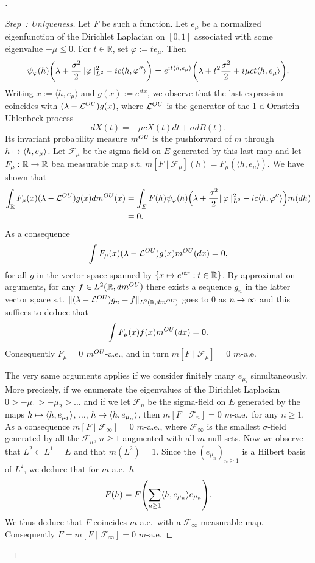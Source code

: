 \documentclass[10pt]{amsart}
\theoremstyle{definition}\newtheorem{defi}[theo]{Definition}\newtheorem{rema}[theo]{Remark}\newtheorem{exam}[theo]{Example}\newtheorem{exem}[theo]{Example}\newtheorem{nota}[theo]{Notation}
\theoremstyle{plain}
\newcommand{\cF}{\mathcal{F}}
\newcommand{\cL}{\mathcal{L}}
\newcommand{\R}{\mathbb{R}}
\let\originalleft\left
\let\originalright\right
\renewcommand{\left}{\mathopen{}\mathclose\bgroup\originalleft}
\renewcommand{\right}{\aftergroup\egroup\originalright}
\newcounter{setofstep}
\newcounter{step}[setofstep]
\newenvironment{step}[1][]{\refstepcounter{step}\begin{proof}[{Step~\thestep\if#1\empty\else: #1\fi}]}{\let\qed\relax\end{proof}}
\renewcommand*{\to}{\mathchoice{\longrightarrow}{\rightarrow}{\rightarrow}{\rightarrow}}
\let\oldmapsto\mapsto
\renewcommand*{\mapsto}{\mathchoice{\longmapsto}{\oldmapsto}{\oldmapsto}{\oldmapsto}}
\newenvironment{proofc}[1][\proofname]{\begin{proof}[#1]}{\end{proof}}
\begin{document}
\begin{proofc}
\begin{step}[{Uniqueness}]
Let $F$ be such a function. Let $e_\mu$ be a normalized eigenfunction of the Dirichlet Laplacian on $[0,1]$ associated with some eigenvalue $-\mu \le 0$. For $t\in\R$, set $\varphi := t e_\mu$. Then
\[
\psi_\varphi(h)\left(\lambda + \frac{\sigma^2}{2} \| \varphi\|_{L^2}^2 - ic \langle h,\varphi''\rangle\right) = e^{it \langle h,e_\mu\rangle} \left(\lambda +t^2 \frac{\sigma^2}{2} + i \mu c t \langle h,e_\mu\rangle\right).
\]
Writing $x := \langle h,e_\mu\rangle$ and $g(x) := e^{itx}$, we observe that the last expression coincides with $(\lambda - \cL^{\tiny OU})g(x)$, where $\cL^{\tiny OU}$ is the generator of the 1-d Ornstein--Uhlenbeck process
\[
dX(t) = -\mu c X(t) dt + \sigma dB(t).
\]
Its invariant probability measure $m^{\tiny OU}$ is the pushforward of $m$ through $h\mapsto \langle h,e_\mu\rangle$. Let $\cF_\mu$ be the sigma-field on $E$ generated by this last map and let $F_\mu:\R\to\R$ be\linebreak a measurable map s.t. $m[F \mid \cF_\mu](h) = F_\mu(\langle h,e_\mu\rangle)$. We have shown that
\begin{align*}
\int_\R F_\mu(x) (\lambda - \cL^{\tiny OU})g(x) dm^{\tiny OU}(x) &= \int_E F(h) \psi_\varphi(h) \Big(\lambda + \frac{\sigma^2}{2} \| \varphi\|_{L^2}^2 - ic \langle h,\varphi''\rangle \Big) m(dh)\\
&=0.
\end{align*}
As a consequence
\[
\int F_\mu(x) (\lambda - \cL^{\tiny OU})g(x) m^{\tiny OU}(dx) =0,
\]
for all $g$ in the vector space spanned by $\{x\mapsto e^{itx}: t\in \R\}$. By approximation arguments, for any $f\in L^2(\R,dm^{\tiny OU})$ there exists a sequence $g_n$ in the latter vector space s.t. $\|(\lambda - \cL^{\tiny OU}) g_n - f\|_{L^2(\R,dm^{\tiny OU})}$ goes to $0$ as $n\to\infty$ and this suffices to deduce that
\[
\int F_\mu(x) f(x) m^{\tiny OU}(dx) =0.
\]
Consequently $F_\mu = 0$ $m^{\tiny OU}$-a.e., and in turn $m[F \mid \cF_\mu]= 0$ $m$-a.e.

The very same arguments applies if we consider finitely many $e_{\mu_i}$ simultaneously. More precisely, if we enumerate the eigenvalues of the Dirichlet Laplacian $0 > -\mu_1 > -\mu_2 > \dots$ and if we let $\cF_n$ be the sigma-field on $E$ generated by the maps $h\mapsto \langle h,e_{\mu_1}\rangle$, $\dots$, $h\mapsto \langle h,e_{\mu_n}\rangle$, then $m[F \mid \cF_n]= 0$ $m$-a.e.~for any $n\ge 1$. As a consequence $m[F \mid \cF_\infty]= 0$ $m$-a.e., where $\cF_\infty$ is the smallest $\sigma$-field generated by all the $\cF_n$, $n\ge 1$ augmented with all $m$-null sets. Now we observe that $L^2 \subset L^1 = E$ and that $m(L^2) = 1$. Since the $(e_{\mu_n})_{n\ge 1}$ is a Hilbert basis of $L^2$, we deduce that for $m$-a.e.~$h$
\[
F(h) = F\left(\sum_{n\ge 1} \langle h,e_{\mu_n}\rangle e_{\mu_n}\right).
\]
We thus deduce that $F$ coincides $m$-a.e.~with a $\cF_\infty$-measurable map. Consequently $F=m[F \mid \cF_\infty]= 0$ $m$-a.e.\qedhere
\end{step}\let\qed\relax
\end{proofc}
\end{document}
